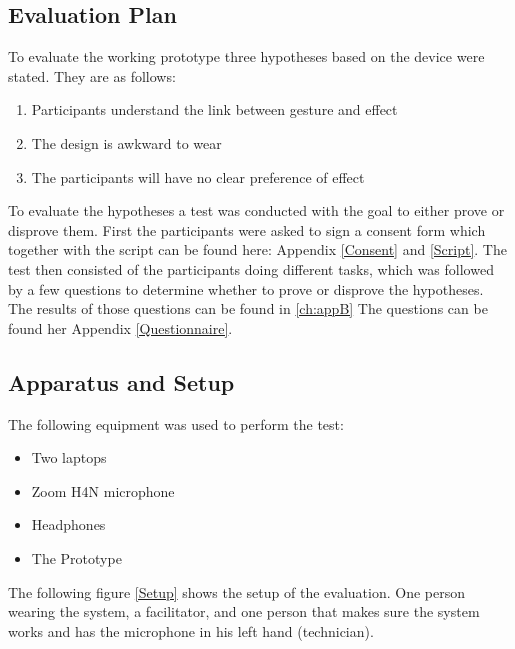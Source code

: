 \subsection{Evaluation Plan}
To evaluate the working prototype three hypotheses based on the device were stated. They are as follows:

\begin{enumerate}
\item Participants understand the link between gesture and effect
\item The design is awkward to wear
\item The participants will have no clear preference of effect
\end{enumerate} 

To evaluate the hypotheses a test was conducted with the goal to either prove or disprove them. First the participants were asked to sign a consent form which together with the script can be found here: Appendix \ref{Consent} and \ref{Script}. The test then consisted of the participants doing different tasks, which was followed by a few questions to determine whether to prove or disprove the hypotheses. The results of those questions can be found in \ref{ch:appB} The questions can be found her Appendix \ref{Questionnaire}. 

\subsection{Apparatus and Setup}

The following equipment was used to perform the test:
\begin{itemize}
 \item Two laptops
 \item Zoom H4N microphone 
 \item Headphones
 \item The Prototype
\end{itemize}

The following figure \ref{Setup} shows the setup of the evaluation. One person wearing the system, a facilitator, and one person that makes sure the system works and has the microphone in 
his left hand (technician).

\begin{minipage}{\linewidth}%
\label{Setup}
\end{minipage}\\

